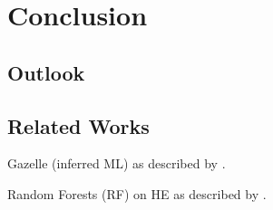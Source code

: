 \chapter{Conclusion}
\label{chap:conclusion}

\section{Outlook}

\section{Related Works}
Gazelle (inferred ML) as described by \cite{2018-gazelle}.

Random Forests (RF) on HE as described by \cite{2020-cryptotree}.
